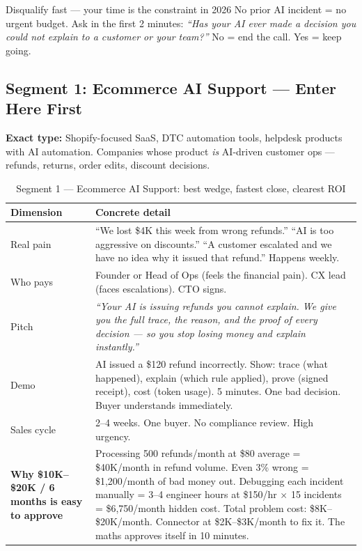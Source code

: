 \begin{warnbox}{Disqualify fast --- your time is the constraint in 2026}
No prior AI incident = no urgent budget. Ask in the first 2 minutes:
\textit{``Has your AI ever made a decision you could not explain to a customer
or your team?''} No = end the call. Yes = keep going.
\end{warnbox}

\subsection{Segment 1: Ecommerce AI Support \texorpdfstring{---}{-} Enter Here First}

\textbf{Exact type:} Shopify-focused SaaS, DTC automation tools, helpdesk
products with AI automation. Companies whose product \emph{is} AI-driven
customer ops --- refunds, returns, order edits, discount decisions.

\begin{table}[H]
\centering\renewcommand{\arraystretch}{1.55}
\begin{tabularx}{\textwidth}{@{}lX@{}}
\toprule
\textbf{Dimension} & \textbf{Concrete detail} \\
\midrule
Real pain & ``We lost \$4K this week from wrong refunds.'' ``AI is too
  aggressive on discounts.'' ``A customer escalated and we have no idea
  why it issued that refund.'' Happens weekly. \\
Who pays & Founder or Head of Ops (feels the financial pain). CX lead
  (faces escalations). CTO signs. \\
Pitch & \textit{``Your AI is issuing refunds you cannot explain. We give
  you the full trace, the reason, and the proof of every decision --- so
  you stop losing money and explain instantly.''} \\
Demo & AI issued a \$120 refund incorrectly. Show: trace (what happened),
  explain (which rule applied), prove (signed receipt), cost (token usage).
  5 minutes. One bad decision. Buyer understands immediately. \\
Sales cycle & 2--4 weeks. One buyer. No compliance review. High urgency. \\
\midrule
\textbf{Why \$10K--\$20K / 6 months is easy to approve} &
  Processing 500 refunds/month at \$80 average = \$40K/month in refund
  volume. Even 3\% wrong = \$1,200/month of bad money out. Debugging each
  incident manually = 3--4 engineer hours at \$150/hr $\times$ 15 incidents =
  \$6,750/month hidden cost. Total problem cost: \$8K--\$20K/month. Connector
  at \$2K--\$3K/month to fix it. The maths approves itself in 10 minutes. \\
\bottomrule
\end{tabularx}
\caption{Segment 1 --- Ecommerce AI Support: best wedge, fastest close, clearest ROI}
\end{table}

